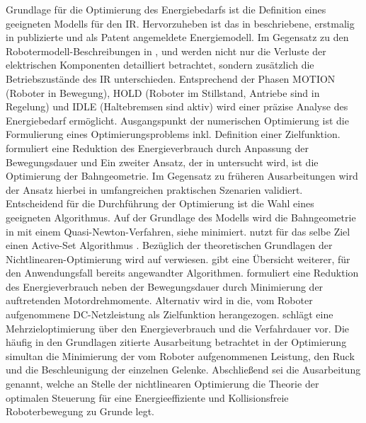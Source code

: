 %
%
Grundlage für die Optimierung des Energiebedarfs ist die Definition eines geeigneten Modells für den IR. 
Hervorzuheben ist das in \cite{Eggers.2019} beschriebene, erstmalig in \cite{Ziaukas.2017} publizierte und als Patent  \cite{Patent.2016} angemeldete Energiemodell. Im Gegensatz zu den Robotermodell-Beschreibungen in \cite{Pellicciari.2011}, \cite{Sergaki.2002} und \cite{Paryanto.2015} werden nicht nur die Verluste der elektrischen Komponenten detailliert betrachtet, sondern zusätzlich die Betriebszustände des IR unterschieden. 
Entsprechend der Phasen MOTION (Roboter in Bewegung), HOLD (Roboter im Stillstand, Antriebe sind in Regelung) und IDLE (Haltebremsen sind aktiv) wird einer präzise Analyse des Energiebedarf ermöglicht\cite{Ziaukas.2017}. 
%
Ausgangspunkt der numerischen Optimierung ist die Formulierung eines Optimierungsproblems inkl. Definition einer Zielfunktion.  
\cite{Ziaukas.2017} formuliert eine  Reduktion des Energieverbrauch durch Anpassung der Bewegungsdauer und 
%
Ein zweiter Ansatz, der in \cite{Eggers.2019} untersucht wird, ist die Optimierung der Bahngeometrie.  Im Gegensatz zu früheren Ausarbeitungen wird der Ansatz hierbei in umfangreichen praktischen Szenarien validiert. 
Entscheidend für die Durchführung der Optimierung ist die Wahl eines geeigneten Algorithmus.%
%
%
Auf der Grundlage des Modells wird die Bahngeometrie in \Cite{Hansen.2012} mit einem Quasi-Newton-Verfahren, siehe \cite[S.~49]{Papageorgiou.2015} minimiert. \cite{Ziaukas.2017} nutzt für das selbe Ziel einen Active-Set Algorithmus \cite[S.~445]{Luenberger.2021}. Bezüglich der theoretischen Grundlagen der Nichtlinearen-Optimierung wird auf \cite{Nocedal.2006} verwiesen. \cite[S.10~ff.]{Carabin.2017} gibt eine Übersicht weiterer, für den Anwendungsfall bereits angewandter Algorithmen.\cite{Ziaukas.2017} formuliert eine Reduktion des Energieverbrauch neben der Bewegungsdauer durch Minimierung der auftretenden Motordrehmomente. Alternativ wird in \cite{Hansen.2012} die, vom Roboter aufgenommene DC-Netzleistung als Zielfunktion herangezogen.\cite{Lin.2018} schlägt eine Mehrzieloptimierung über den  Energieverbrauch und die Verfahrdauer vor. Die häufig in den Grundlagen zitierte Ausarbeitung \cite{Saravanan.2008} betrachtet in der Optimierung simultan die Minimierung der vom Roboter aufgenommenen Leistung, den Ruck  und die Beschleunigung der einzelnen Gelenke. Abschließend sei die Ausarbeitung  \cite{Bjorkenstam.2013} genannt, welche an Stelle der nichtlinearen Optimierung die Theorie der optimalen Steuerung für eine Energieeffiziente und Kollisionsfreie Roboterbewegung zu Grunde legt.
